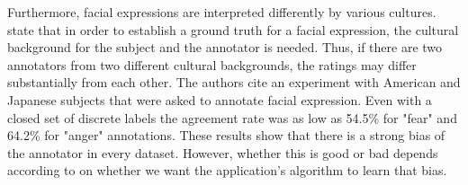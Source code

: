 \newline\newline
Furthermore, facial expressions are interpreted differently by various cultures. \citet{Salah:2018:VideoBasedER} state that in order to establish a ground truth for a facial expression, the cultural background for the subject and the annotator is needed. Thus, if there are two annotators from two different cultural backgrounds, the ratings may differ substantially from each other. The authors \citep{Salah:2018:VideoBasedER} cite an experiment with American and Japanese subjects that were asked to annotate facial expression. Even with a closed set of discrete labels the agreement rate was as low as 54.5\% for "fear" and 64.2\% for "anger" annotations. These results show that there is a strong bias of the annotator in every dataset. However, whether this is good or bad depends according to \citet{Salah:2018:VideoBasedER} on whether we want the application's algorithm to learn that bias.

